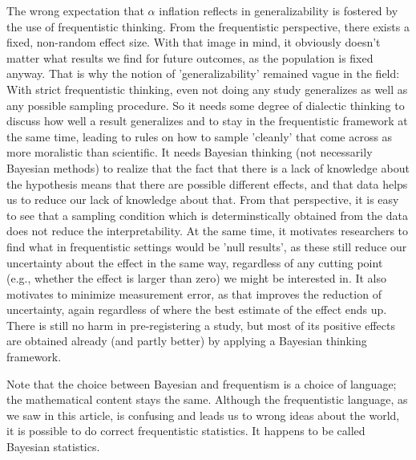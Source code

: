 \documentclass[man]{apa7}
\theoremstyle{definition}
\begin{document}
The wrong expectation that $\alpha$ inflation reflects in generalizability is fostered by the use of frequentistic thinking. From the frequentistic perspective, there exists a fixed, non-random effect size. With that image in mind, it obviously doesn't matter what results we find for future outcomes, as the population is fixed anyway. That is why the notion of 'generalizability' remained vague in the field: With strict frequentistic thinking, even not doing any study generalizes as well as any possible sampling procedure. So it needs some degree of dialectic thinking to discuss how well a result generalizes and to stay in the frequentistic framework at the same time, leading to rules on how to sample 'cleanly' that come across as more moralistic than scientific. It needs Bayesian thinking (not necessarily Bayesian methods) to realize that the fact that there is a lack of knowledge about the hypothesis means that there are possible different effects, and that data helps us to reduce our lack of knowledge about that. From that perspective, it is easy to see that a sampling condition which is determinstically obtained from the data does not reduce the interpretability. At the same time, it motivates researchers to find what in frequentistic settings would be 'null results', as these still reduce our uncertainty about the effect in the same way, regardless of any cutting point (e.g., whether the effect is larger than zero) we might be interested in. It also motivates to minimize measurement error, as that improves the reduction of uncertainty, again regardless of where the best estimate of the effect ends up. There is still no harm in pre-registering a study, but most of its positive effects are obtained already (and partly better) by applying a Bayesian thinking framework.

Note that the choice between Bayesian and frequentism is a choice of language; the mathematical content stays the same. Although the frequentistic language, as we saw in this article, is confusing and leads us to wrong ideas about the world, it is possible to do correct frequentistic statistics. It happens to be called Bayesian statistics.

\printbibliography
\end{document}
